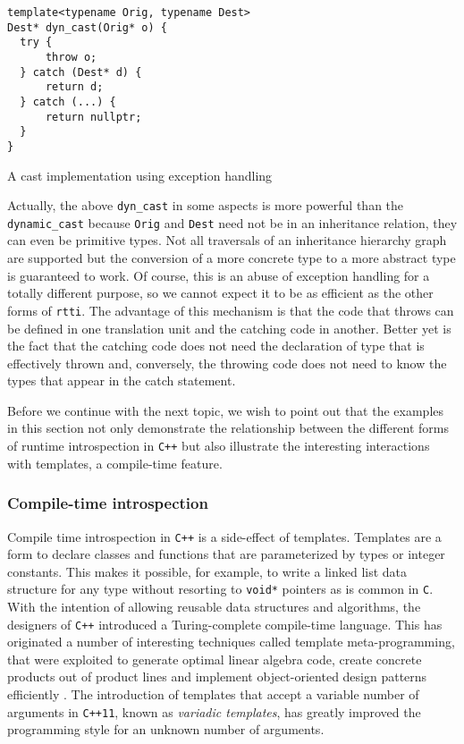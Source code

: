 \begin{listing}[H]
\begin{verbatim}
template<typename Orig, typename Dest>
Dest* dyn_cast(Orig* o) {
  try {
      throw o;
  } catch (Dest* d) {
      return d;
  } catch (...) {
      return nullptr;
  }
}
\end{verbatim}
\caption{A cast implementation using exception handling}
\label{lst:dyncast}
\end{listing}

Actually, the above \texttt{dyn\_cast} in some aspects is more powerful than the \texttt{dynamic\_cast} because \texttt{Orig} and
\texttt{Dest} need not be in an inheritance relation, they can even be primitive types. Not all traversals of an inheritance
hierarchy graph are supported but the conversion of a more concrete type to a more abstract type is guaranteed to work.
Of course, this is an abuse of exception handling for a totally different purpose, so we cannot expect it to be as efficient
as the other forms of \texttt{rtti}. The advantage of this mechanism is that the code that throws can be defined in one translation unit
and the catching code in another. Better yet is the fact that the catching code does not need the declaration of type that is effectively
thrown and, conversely, the throwing code does not need to know the types that appear in the catch statement. 

Before we continue with the next topic, we wish to point out that the examples in this section not only demonstrate the relationship
between the different forms of runtime introspection in \texttt{C++} but also illustrate the interesting interactions with templates, a compile-time
feature.

\subsubsection{Compile-time introspection}

Compile time introspection in \texttt{C++} is a side-effect of templates. Templates are a form to declare classes and functions that are parameterized
by types or integer constants. This makes it possible, for example, to write a linked list data structure for any type without resorting
to \texttt{void*} pointers as is common in \texttt{C}. With the intention of allowing reusable data structures and algorithms, the designers
of \texttt{C++} introduced a Turing-complete compile-time language. This has originated a number of interesting techniques called template
meta-programming, that were exploited to generate optimal linear algebra code\cite{veldhuizen}, create concrete products out of product
lines\cite{czarnecki} and implement object-oriented design patterns efficiently \cite{alexbook}. The introduction of templates that accept
a variable number of arguments in \texttt{C++11}, known as \emph{variadic templates}, has greatly improved the programming style for an unknown number
of arguments.

